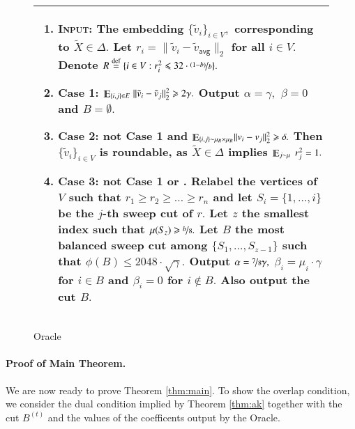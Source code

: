 \documentclass[twoside,leqno,twocolumn]{article}
\newcommand{\nfrac}{\nicefrac}
\renewcommand{\mathbb}{\varmathbb}
\renewcommand{\leq}{\leqslant}
\renewcommand{\geq}{\geqslant}
\newcommand{\norm}[1]{\lVert#1\rVert}
\newcommand{\defeq}{\stackrel{\textup{def}}{=}}
\newcommand{\Esymb}{\mathbb{E}}
\DeclareMathOperator*{\E}{\Esymb}
\numberwithin{equation}{section}
\newcommand{\avg}{{\ensuremath{\mathsf{avg}}\xspace}}
\begin{document}
\begin{figure*}[htb]
  	\begin{tabularx}{\textwidth}{|X|}
    \hline
  	\begin{enumerate}
\item {\bf \textsc{Input:}} The embedding $\{\tilde{v}_i\}_{i \in V},$ corresponding to $\tilde{X} \in \Delta.$ Let $r_i = \norm{\tilde{v}_i - \tilde{v}_\avg}_2$ for all $i \in V.$
Denote $R \defeq \{i \in V : r_i^2 \leq 32 \cdot \nfrac{(1-b)}{b}\}.$
\item {\sc Case 1}:  $\E_{\{i,j\} \in E}\;\norm{\tilde{v}_i-\tilde{v}_j}_2^2  \geq  2\gamma.$ 
	Output $\alpha = \gamma,$ $\beta = 0$ and $B = \emptyset.$
	\item {\sc Case 2}: not {\sc Case 1} and $\E_{\{i,j\} \sim \mu_R \times \mu_R }\norm{v_i - v_j}_2^2 \geq \delta.$ Then $\{\tilde{v}_{i}\}_{i\in V}$ is roundable, as $\tilde{X} \in \Delta$ implies $\E_{j \sim \mu}\; r_j^2 = 1.$
\item \label{stp:cut} {\sc Case 3}: not {\sc Case 1} or {\sc 2}. Relabel the vertices of $V$ such that $r_1 \geq r_2 \geq \ldots \geq r_n$ and let $S_i=\{1, \ldots,i\}$ be the $j$-th sweep cut of $r.$ 
Let $z$ the smallest index such that $\mu(S_z) \geq \nfrac{b}{8}.$ 	Let $B$ the most balanced sweep cut among $\{S_1, \ldots, S_{z-1}\}$ such that $\phi(B) \leq 2048 \cdot \sqrt{\gamma}.$  Output $\alpha = \nfrac{7}{8} \gamma,$ $\beta_i = \mu_i \cdot \gamma$ for $i \in B$ and $\beta_i = 0$ for $i \notin B.$ Also output the cut $B.$ 
 \end{enumerate}\\
   \hline
    \end{tabularx}
  \caption{{\sc Oracle}}
  \label{fig:oracle}
\end{figure*}


\paragraph{Proof of Main Theorem.}  We are now ready to prove Theorem \ref{thm:main}. To show the overlap condition,  we consider the dual condition implied by Theorem \ref{thm:ak} together with the cut $B^{(t)}$ and the values of the coefficents output by the {\sc Oracle}.
\end{document}
